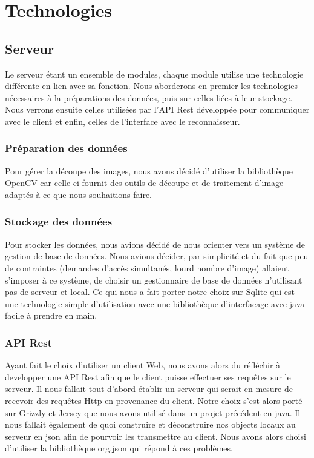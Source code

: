 \section{Technologies}


\subsection{Serveur}

Le serveur étant un ensemble de modules, chaque module utilise une technologie différente en lien avec sa fonction. Nous aborderons en premier les technologies nécessaires à la préparations des données, puis sur celles liées à leur stockage. Nous verrons ensuite celles utilisées par l'API Rest développée pour communiquer avec le client et enfin, celles de l'interface avec le reconnaisseur.

\subsubsection{Préparation des données}

Pour gérer la découpe des images, nous avons décidé d'utiliser la bibliothèque OpenCV car celle-ci fournit des outils de découpe et de traitement d'image adaptés à ce que nous souhaitions faire.

\subsubsection{Stockage des données}

Pour stocker les données, nous avions décidé de nous orienter vers un système de gestion de base de données. Nous avions décider, par simplicité et du fait que peu de contraintes (demandes d'accès simultanés, lourd nombre d'image) allaient s'imposer à ce système, de choisir un gestionnaire de base de données n'utilisant pas de serveur et local. Ce qui nous a fait porter notre choix sur Sqlite qui est une technologie simple d'utilisation avec une bibliothèque d'interfacage avec java facile à prendre en main.

\subsubsection{API Rest}

Ayant fait le choix d'utiliser un client Web, nous avons alors du réfléchir à developper une API Rest afin que le client puisse effectuer ses requêtes sur le serveur. Il nous fallait tout d'abord établir un serveur qui serait en mesure de recevoir des requêtes Http en provenance du client. Notre choix s'est alors porté sur Grizzly et Jersey que nous avons utilisé dans un projet précédent en java. Il nous fallait également de quoi construire et déconstruire nos objects locaux au serveur en json afin de pourvoir les transmettre au client. Nous avons alors choisi d'utiliser la bibliothèque org.json qui répond à ces problèmes.


